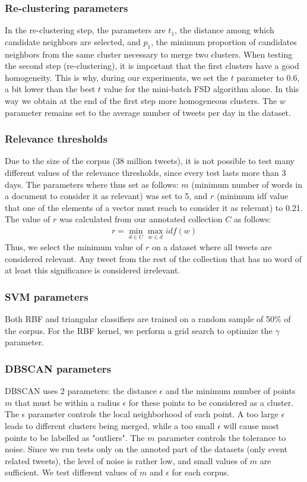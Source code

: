 \subsubsection{Re-clustering parameters}
In the re-clustering step, the parameters are $t_1$, the distance among which candidate neighbors are selected, and $p_1$, the minimum proportion of candidates neighbors from the same cluster necessary to merge two clusters.
When testing the second step (re-clustering), it is important that the first clusters have a good homogeneity. This is why, during our experiments, we set the $t$ parameter to 0.6, a bit lower than the best $t$ value for the mini-batch FSD algorithm alone. In this way we obtain at the end of the first step more homogeneous clusters. The $w$ parameter remains set to the average number of tweets per day in the dataset.

\subsubsection{Relevance thresholds}
Due to the size of the corpus (38 million tweets), it is not possible to test many different values of the relevance thresholds, since every test lasts more than 3 days. The parameters where thus set as follows: $m$ (minimum number of words in a document to consider it as relevant) was set to 5, and $r$ (minimum idf value that one of the elements of a vector must reach to consider it as relevant) to 0.21. The value of $r$ was calculated from our annotated collection $C$ as follows: 
\begin{align*}
r = \min_{d \in C}\max_{w \in d}idf(w)
\end{align*}
Thus, we select the minimum value of $r$ on a dataset where all tweets are considered relevant. Any tweet from the rest of the collection that has no word of at least this significance is considered irrelevant.

\subsubsection{SVM parameters}
Both RBF and triangular classifiers are trained on a random sample of 50\% of the corpus. For the RBF kernel, we perform a grid search to optimize the $\gamma$ parameter. 

\subsubsection{DBSCAN parameters}
DBSCAN uses 2 parameters: the distance $\epsilon$ and the minimum number of points $m$ that must be within a radius $\epsilon$ for these points to be considered as a cluster. The $\epsilon$ parameter controls the local neighborhood of each point. A too large $\epsilon$ leads to different clusters being merged, while a too small $\epsilon$ will cause most points to be labelled as "outliers". The $m$ parameter controls the tolerance to noise. Since we run tests only on the annoted part of the datasets (only event related tweets), the level of noise is rather low, and small values of $m$ are sufficient. We test different values of $m$ and $\epsilon$ for each corpus.

